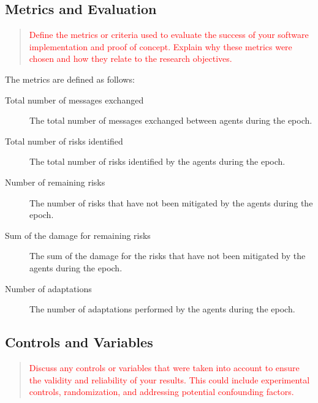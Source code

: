 \subsection{Metrics and Evaluation}
\label{ssec:metrics}
\begin{quote}\textcolor{red}{
    Define the metrics or criteria used to evaluate the success of your software implementation and proof of concept. Explain why these metrics were chosen and how they relate to the research objectives.
}\end{quote}

The metrics are defined as follows:

\begin{description}
    \item[Total number of messages exchanged] The total number of messages exchanged between agents during the epoch.
    \item[Total number of risks identified] The total number of risks identified by the agents during the epoch.
    \item[Number of remaining risks] The number of risks that have not been mitigated by the agents during the epoch.
    \item[Sum of the damage for remaining risks] The sum of the damage for the risks that have not been mitigated by the agents during the epoch.
    \item[Number of adaptations] The number of adaptations performed by the agents during the epoch.
\end{description}

\subsection{Controls and Variables}
\label{ssec:controls-variables}
\begin{quote}\textcolor{red}{
    Discuss any controls or variables that were taken into account to ensure the validity and reliability of your results. This could include experimental controls, randomization, and addressing potential confounding factors.
}\end{quote}


